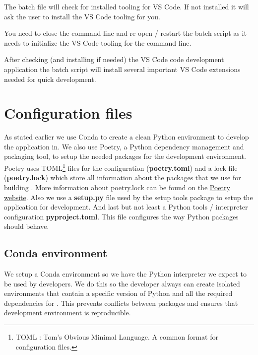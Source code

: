 The batch file will check for installed tooling for VS Code.
If not installed it will ask the user to install the VS Code tooling for you. 

\begin{Note}
You need to close the command line and re-open / restart the batch script as it needs to initialize the VS Code tooling for the command line.
\end{Note}

After checking (and installing if needed) the VS Code code development application the batch script will install several important VS Code extensions needed for quick development.

\section{Configuration files}
As stated earlier we use Conda to create a clean Python environment to develop the \dfastmi application in.
We also use Poetry, a Python dependency management and packaging tool, to setup the needed packages for the development environment.
Poetry uses TOML\footnote{TOML : Tom's Obvious Minimal Language. A common format for configuration files.} files for the configuration (\textbf{poetry.toml}) and a lock file (\textbf{poetry.lock}) which store all information about the packages that we use for building \dfastmi.
More information about poetry.lock can be found on the \href{https://python-poetry.org/docs/basic-usage/#installing-without-poetrylock}{Poetry website}.
Also we use a \textbf{setup.py} file used by the setup tools package to setup the application for development.
And last but not least a Python tools / interpreter configuration \textbf{pyproject.toml}.
This file configures the way Python packages should behave.

\subsection{Conda environment}
We setup a Conda environment so we have the Python interpreter we expect to be used by developers.
We do this so the developer always can create isolated environments that contain a specific version of Python and all the required dependencies for \dfmi.
This prevents conflicts between packages and ensures that \dfmi development environment is reproducible.

